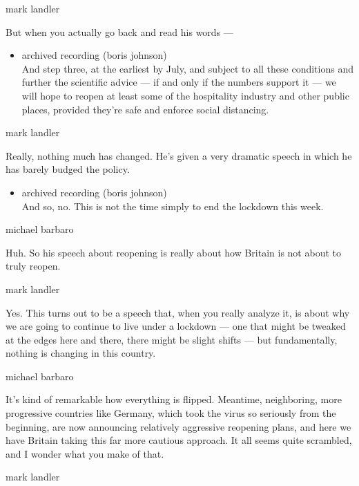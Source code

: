 mark landler

But when you actually go back and read his words ---

\begin{itemize}
\tightlist
\item
  archived recording (boris johnson)\\
  And step three, at the earliest by July, and subject to all these
  conditions and further the scientific advice --- if and only if the
  numbers support it --- we will hope to reopen at least some of the
  hospitality industry and other public places, provided they're safe
  and enforce social distancing.
\end{itemize}

mark landler

Really, nothing much has changed. He's given a very dramatic speech in
which he has barely budged the policy.

\begin{itemize}
\tightlist
\item
  archived recording (boris johnson)\\
  And so, no. This is not the time simply to end the lockdown this week.
\end{itemize}

michael barbaro

Huh. So his speech about reopening is really about how Britain is not
about to truly reopen.

mark landler

Yes. This turns out to be a speech that, when you really analyze it, is
about why we are going to continue to live under a lockdown --- one that
might be tweaked at the edges here and there, there might be slight
shifts --- but fundamentally, nothing is changing in this country.

michael barbaro

It's kind of remarkable how everything is flipped. Meantime,
neighboring, more progressive countries like Germany, which took the
virus so seriously from the beginning, are now announcing relatively
aggressive reopening plans, and here we have Britain taking this far
more cautious approach. It all seems quite scrambled, and I wonder what
you make of that.

mark landler

